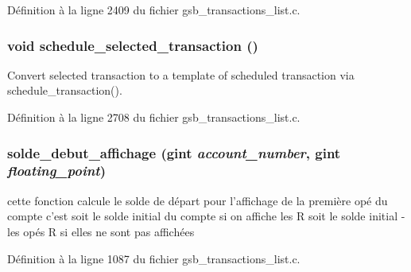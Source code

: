 Définition à la ligne 2409 du fichier gsb\_\-transactions\_\-list.c.

\subsubsection[{schedule\_\-selected\_\-transaction}]{\setlength{\rightskip}{0pt plus 5cm}void schedule\_\-selected\_\-transaction ()}\label{gsb__transactions__list_8h_a57f2d9faad61b1154270e444656bd275}
Convert selected transaction to a template of scheduled transaction via schedule\_\-transaction(). 

Définition à la ligne 2708 du fichier gsb\_\-transactions\_\-list.c.

\subsubsection[{solde\_\-debut\_\-affichage}]{ solde\_\-debut\_\-affichage (gint {\em account\_\-number}, \/  gint {\em floating\_\-point})}\label{gsb__transactions__list_8h_ad8b68b6ef2fd8238d726e11c981fc701}
cette fonction calcule le solde de départ pour l'affichage de la première opé du compte c'est soit le solde initial du compte si on affiche les R soit le solde initial -\/ les opés R si elles ne sont pas affichées 

Définition à la ligne 1087 du fichier gsb\_\-transactions\_\-list.c.

